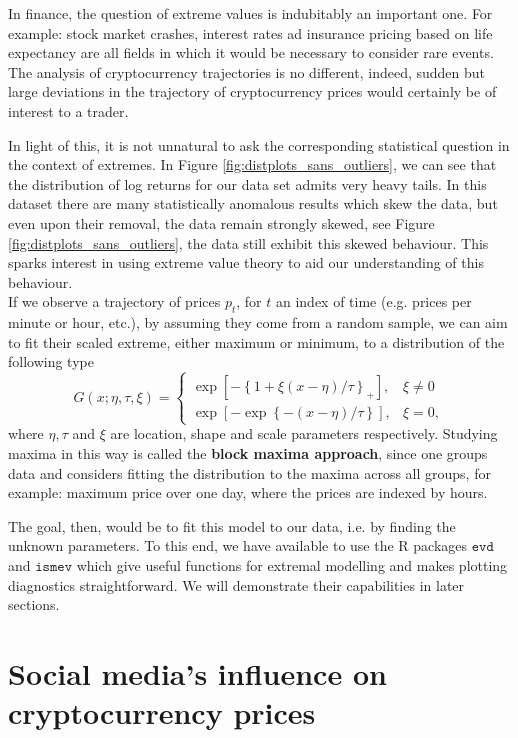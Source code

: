 \documentclass[twoside]{report}
\newcommand{\code}{\texttt}
\begin{document}
\begin{spacing}{1}
In finance, the question of extreme values is indubitably an important one. For example: stock market crashes, interest rates ad  insurance pricing based on life expectancy are all fields in which it would be necessary to consider rare events. The analysis of cryptocurrency trajectories is no different, indeed, sudden but large deviations in the trajectory of cryptocurrency prices would certainly be of interest to a trader. 

In light of this, it is not unnatural to ask the corresponding statistical question in the context of extremes. In Figure \ref{fig:distplots_sans_outliers}, we can see that the distribution of log returns for our data set admits very heavy tails. In this dataset there are many statistically anomalous results which skew the data, but even upon their removal, the data remain strongly skewed, see Figure \ref{fig:distplots_sans_outliers}, the data still exhibit this skewed behaviour. This sparks interest in using extreme value theory to aid our understanding of this behaviour.\\

If we observe a trajectory of prices $p_t$, for $t$ an index of time (e.g. prices per minute or hour, etc.), by assuming they come from a random sample, we can aim to fit their scaled extreme, either maximum or minimum, to a distribution of the following type \[
G(x; \eta, \tau, \xi) = \begin{cases}
\exp\left[-\left\{1+\xi(x-\eta)/\tau\right\}_+\right], & \xi \ne 0\\
\exp\left[-\exp\left\{-(x-\eta)/\tau\right\}\right], & \xi = 0,
\end{cases}
\]
where $\eta, \tau$ and $\xi$ are location, shape and scale parameters respectively. Studying maxima in this way is called the \textbf{block maxima approach}, since one groups data and considers fitting the distribution to the maxima across all groups, for example: maximum price over one day, where the prices are indexed by hours.

The goal, then, would be to fit this model to our data, i.e. by finding the unknown parameters. To this end, we have available to use the R packages $\code{evd}$ and $\code{ismev}$ which give useful functions for extremal modelling and makes plotting diagnostics straightforward. We will demonstrate their capabilities in later sections. 





\chapter{Social media's influence on cryptocurrency prices}


\end{spacing}
\end{document}
